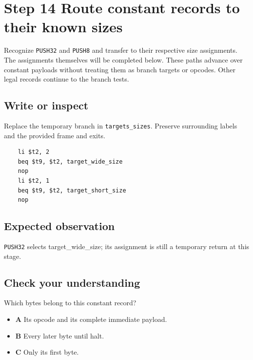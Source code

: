 \section{Step 14 Route constant records to their known sizes}\label{vm-s14}

Recognize \texttt{PUSH32} and \texttt{PUSH8} and transfer to their respective size assignments. The assignments themselves will be completed below. These paths advance over constant payloads without treating them as branch targets or opcodes. Other legal records continue to the branch tests.

\subsection{Write or inspect}
Replace the temporary branch in \texttt{targets\_sizes}. Preserve surrounding labels and the provided frame and exits.

\begin{verbatim}
    li $t2, 2
    beq $t9, $t2, target_wide_size
    nop
    li $t2, 1
    beq $t9, $t2, target_short_size
    nop
\end{verbatim}
\subsection{Expected observation}
\texttt{PUSH32} selects target\_wide\_size; its assignment is still a temporary return at this stage.

\subsection{Check your understanding}
Which bytes belong to this constant record?

\begin{itemize}
  \item \textbf{A} Its opcode and its complete immediate payload.
  \item \textbf{B} Every later byte until halt.
  \item \textbf{C} Only its first byte.
\end{itemize}
